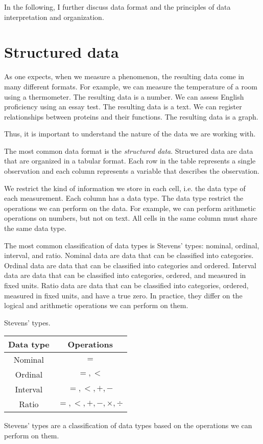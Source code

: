 In the following, I further discuss data format and the principles of data interpretation
and organization.

\chapter{Structured data}

As one expects, when we measure a phenomenon, the resulting data come in many different
formats.  For example, we can measure the temperature of a room using a thermometer.  The
resulting data is a number.  We can assess English proficiency using an essay test.  The
resulting data is a text.  We can register relationships between proteins and
their functions.  The resulting data is a graph.

Thus, it is important to understand the nature of the data we are working with.

The most common data format is the \emph{structured data}.  Structured data are data that
are organized in a tabular format.  Each row in the table represents a single observation
and each column represents a variable that describes the observation.

We restrict the kind of information we store in each cell, i.e. the data type of each
measurement.  Each column has a data type.  The data type restrict the operations we can
perform on the data.  For example, we can perform arithmetic operations on numbers, but
not on text.  All cells in the same column must share the same data type.

The most common classification of data types is Stevens' types: nominal, ordinal,
interval, and ratio.  Nominal data are data that can be classified into categories.
Ordinal data are data that can be classified into categories and ordered.  Interval data
are data that can be classified into categories, ordered, and measured in fixed units.
Ratio data are data that can be classified into categories, ordered, measured in fixed
units, and have a true zero.  In practice, they differ on the logical and arithmetic operations
we can perform on them.

\begin{tablebox}[label=tab:stevens]{Stevens' types.}
  \centering
  \begin{tabular}{cc}
    \toprule
    \textbf{Data type} & \textbf{Operations} \\
    \midrule
    Nominal & $=$ \\
    Ordinal & $=, <$ \\
    Interval & $=, <, +, - $ \\
    Ratio & $=, <, +, -, \times, \div$ \\
    \bottomrule
  \end{tabular}
  \tcblower
  Stevens' types are a classification of data types based on the operations we can perform
  on them.
\end{tablebox}

